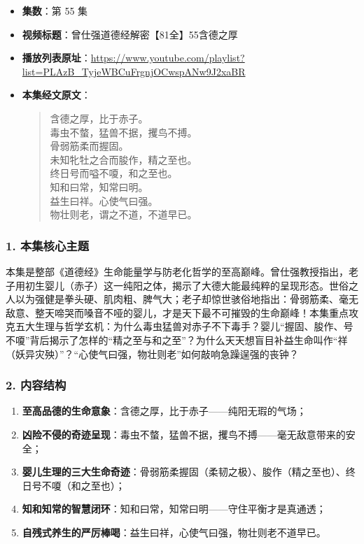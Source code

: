 \begin{itemize}
    \item \textbf{集数}：第 55 集
    \item \textbf{视频标题}：曾仕强道德经解密【81全】55含德之厚
    \item \textbf{播放列表原址}：\url{https://www.youtube.com/playlist?list=PLAzB_TyjeWBCuFrgnjOCwspANw9J2xaBR}
    \item \textbf{本集经文原文}：
    \begin{quote}\kaishu
    含德之厚，比于赤子。\\
    毒虫不螫，猛兽不据，攫鸟不搏。\\
    骨弱筋柔而握固。\\
    未知牝牡之合而朘作，精之至也。\\
    终日号而嗌不嗄，和之至也。\\
    知和曰常，知常曰明。\\
    益生曰祥。心使气曰强。\\
    物壮则老，谓之不道，不道早已。
    \end{quote}
\end{itemize}

\subsubsection{1. 本集核心主题}
本集是整部《道德经》生命能量学与防老化哲学的至高巅峰。曾仕强教授指出，老子用初生婴儿（赤子）这一纯阳之体，揭示了大德大能最纯粹的呈现形态。世俗之人以为强健是拳头硬、肌肉粗、脾气大；老子却惊世骇俗地指出：骨弱筋柔、毫无敌意、整天啼哭而嗓音不哑的婴儿，才是天下最不可摧毁的生命巅峰！本集重点攻克五大生理与哲学玄机：为什么毒虫猛兽对赤子不下毒手？婴儿“握固、朘作、号不嗄”背后揭示了怎样的“精之至与和之至”？为什么天天想盲目补益生命叫作“祥（妖异灾殃）”？“心使气曰强，物壮则老”如何敲响急躁逞强的丧钟？

\subsubsection{2. 内容结构}
\begin{enumerate}
    \item \textbf{至高品德的生命意象}：含德之厚，比于赤子——纯阳无瑕的气场；
    \item \textbf{凶险不侵的奇迹呈现}：毒虫不螫，猛兽不据，攫鸟不搏——毫无敌意带来的安全；
    \item \textbf{婴儿生理的三大生命奇迹}：骨弱筋柔握固（柔韧之极）、朘作（精之至也）、终日号不嗄（和之至也）；
    \item \textbf{知和知常的智慧闭环}：知和曰常，知常曰明——守住平衡才是真通透；
    \item \textbf{自残式养生的严厉棒喝}：益生曰祥，心使气曰强，物壮则老不道早已。
\end{enumerate}

